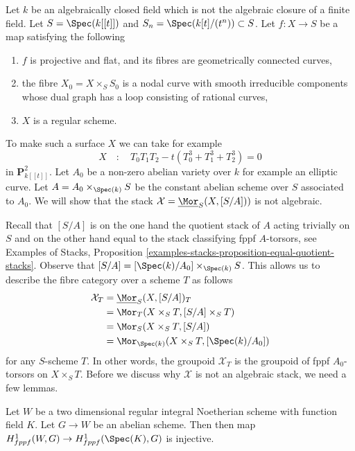 \medskip\noindent
Let $k$ be an algebraically closed field which is not the algebraic
closure of a finite field. Let $S = \Spec(k[[t]])$
and $S_n = \Spec(k[t]/(t^n)) \subset S$. Let $f : X \to S$ be a map
satisfying the following
\begin{enumerate}
\item $f$ is projective and flat, and its fibres are geometrically
connected curves,
\item the fibre $X_0 = X \times_S S_0$ is a nodal curve with smooth
irreducible components whose dual graph has a loop consisting of
rational curves,
\item $X$ is a regular scheme.
\end{enumerate}
To make such a surface $X$ we can take for example
$$
X\quad :\quad T_0T_1T_2 - t(T_0^3 + T_1^3 + T_2^3) = 0
$$
in $\mathbf{P}^2_{k[[t]]}$. Let $A_0$ be a non-zero abelian variety over $k$
for example an elliptic curve.  Let $A = A_0 \times_{\Spec(k)} S$ be the
constant abelian scheme over $S$ associated to $A_0$. We will show that the
stack $\mathcal{X} = \underline{\Mor}_S(X, [S/A]))$ is not algebraic.

\medskip\noindent
Recall that $[S/A]$ is on the one hand the quotient stack of $A$ acting
trivially on $S$ and on
the other hand equal to the stack classifying fppf $A$-torsors, see
Examples of Stacks, Proposition
\ref{examples-stacks-proposition-equal-quotient-stacks}.
Observe that $[S/A] = [\Spec(k)/A_0] \times_{\Spec(k)} S$. This allows
us to describe the fibre category over a scheme $T$ as follows
\begin{align*}
\mathcal{X}_T
& =
\underline{\Mor}_S(X, [S/A])_T \\
& =
\Mor_T(X \times_S T, [S/A] \times_S T) \\
& =
\Mor_S(X \times_S T, [S/A]) \\
& =
\Mor_{\Spec(k)}(X \times_S T, [\Spec(k)/A_0])
\end{align*}
for any $S$-scheme $T$. In other words, the groupoid $\mathcal{X}_T$
is the groupoid of fppf $A_0$-torsors on $X \times_S T$.
Before we discuss why $\mathcal{X}$ is not an algebraic stack,
we need a few lemmas.

\begin{lemma}
\label{lemma-torsors-over-two-dimensional-regular}
Let $W$ be a two dimensional regular integral Noetherian scheme
with function field $K$. Let $G \to W$ be an abelian scheme.
Then then map $H^1_{fppf}(W, G) \to H^1_{fppf}(\Spec(K), G)$
is injective.
\end{lemma}

